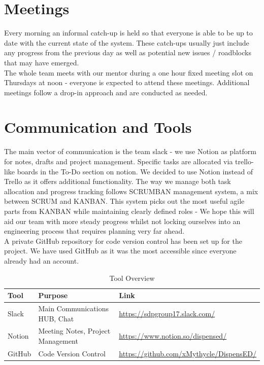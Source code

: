 \documentclass[a4paper,10pt,DIV10,openright,openbib]{scrreprt}
\let\oldbibliography%
\renewcommand{}[1]{{%
  \let\chapter\section%
  \oldbibliography{#1}}}%
\begin{document}
\section{Meetings}
Every morning an informal catch-up is held so that everyone is able to be up to
date with the current state of the system. These catch-ups usually just include
any progress from the previous day as well as potential new issues / roadblocks
that may have emerged.\\
The whole team meets with our mentor during a one hour fixed meeting slot on
Thursdays at noon - everyone is expected to attend these meetings.
Additional meetings follow a drop-in approach and are conducted as needed.


\section{Communication and Tools}
The main vector of communication is the team slack - we use Notion as platform for notes,
drafts and project management. Specific tasks are allocated via trello-like boards in
the To-Do section on notion. We decided to use Notion instead of Trello as it
offers additional functionality. The way we manage both task allocation and
progress tracking follows SCRUMBAN management system, a mix between SCRUM
and KANBAN. This system picks out the most useful agile parts from KANBAN while
maintaining clearly defined roles - We hope this will aid our team with more
steady progress whilst not locking ourselves into an engineering process that
requires planning very far ahead. \\
A private GitHub repository for code version control has been set
up for the project. We have used GitHub as it was the most accessible since
everyone already had an account.\\
\begin{table}[h]
\centering
\caption{Tool Overview}
\begin{tabular}{@{}lll@{}}
\toprule
Tool   & Purpose                                   & Link     \\ \midrule
Slack  & Main Communications HUB, Chat             & \url{https://sdpgroup17.slack.com/} \\
Notion & Meeting Notes, Project Management & \url{https://www.notion.so/dispensed/} \\
GitHub & Code Version Control                      & \url{https://github.com/xMythycle/DispensED/} \\ \bottomrule
\end{tabular}
\end{table}




%


\end{document}
